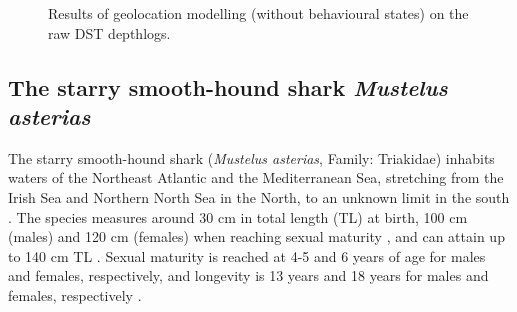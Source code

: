 \documentclass[
  authoryear,
  review,
  3p]{elsarticle}
\begin{document}
\begin{figure}

\begin{minipage}[t]{\linewidth}

{\centering 


}

\end{minipage}%
\newline
\begin{minipage}[t]{\linewidth}

{\centering 


}

\end{minipage}%

\caption{\label{fig-mapgeolocation}Results of geolocation modelling
(without behavioural states) on the raw DST depthlogs.}

\end{figure}

\hypertarget{the-starry-smooth-hound-shark-mustelus-asterias}{%
\subsection{\texorpdfstring{The starry smooth-hound shark \emph{Mustelus
asterias}}{The starry smooth-hound shark Mustelus asterias}}\label{the-starry-smooth-hound-shark-mustelus-asterias}}

The starry smooth-hound shark (\emph{Mustelus asterias}, Family:
Triakidae) inhabits waters of the Northeast Atlantic and the
Mediterranean Sea, stretching from the Irish Sea and Northern North Sea
in the North, to an unknown limit in the south \citep{ices_2022}. The
species measures around 30 cm in total length (TL) at birth, 100 cm
(males) and 120 cm (females) when reaching sexual maturity
\citep{farrell_2010}, and can attain up to 140 cm TL
\citep{mccullyphillips_2015}. Sexual maturity is reached at 4-5 and 6
years of age for males and females, respectively, and longevity is 13
years and 18 years for males and females, respectively
\citep{farrell_2010}.
\end{document}
